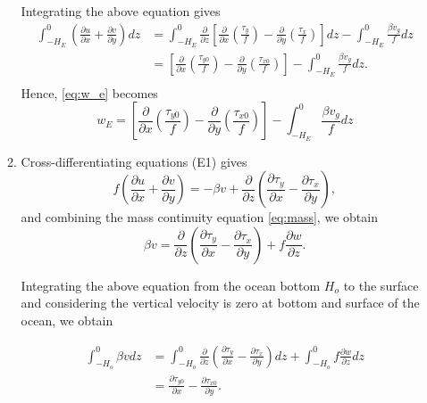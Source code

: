 \documentclass[a4paper]{article}
\begin{document}
\begin{enumerate}[label=\textbf{\arabic*.}]
\begin{enumerate}[label=\textbf{(\alph*)}]
			Integrating the above equation gives
			$$\begin{aligned}
			 \int_{-H_{E}}^{0} \left( \frac { \partial u } { \partial x } + \frac { \partial v} { \partial y }\right)dz 	&= \int_{ -H_E }^{0}\frac { \partial } {\partial z} \left[\frac{\partial }{\partial x} \left(\frac{\tau_y}{f}\right)- \frac{\partial }{\partial y}\left(\frac{\tau_x}{f}\right) \right] dz - \int_{- H_E }^{ 0} \frac { \beta v_{ g }  } { f } d z \\
			 & =\left[ \frac { \partial } { \partial x } \left( \frac { \tau  _ { y 0} } { f } \right) - \frac { \partial } { \partial y } \left( \frac { \tau _ { x0} } { f } \right)\right]- \int_{- H_E }^{ 0} \frac { \beta v_{ g }  } { f } d z.\\
			\end{aligned} $$
			Hence, \eqref{eq:w_e} becomes
			$$w_E=\left[ \frac { \partial } { \partial x } \left( \frac { \tau  _ { y 0} } { f } \right) - \frac { \partial } { \partial y } \left( \frac { \tau _ { x0} } { f } \right)\right]-\int_{- H_E }^{ 0} \frac { \beta v_{ g }  } { f } d z $$
			
			\item Cross-differentiating equations (E1) gives
			$$f\left(\frac { \partial u}{\partial x } + \frac { \partial v}{ \partial y }  \right) =  - \beta v+\frac { \partial } {\partial z} \left( \frac{\partial \tau_y}{\partial x} - \frac{\partial \tau_x}{\partial y} \right), $$
			and combining the mass continuity equation \eqref{eq:mass}, we obtain
			$$\beta v = \frac { \partial } {\partial z} \left( \frac{\partial \tau_y}{\partial x} - \frac{\partial \tau_x}{\partial y} \right) +f\frac{\partial w}{\partial z}.$$
			
			Integrating the above equation from the ocean bottom $H_o$ to the surface and considering the vertical velocity is zero at bottom and surface of the ocean, we obtain
			
			$$ \begin{aligned}
			\int_{-H_o}^0 \beta v d z & = \int_{-H_o}^0 \frac { \partial } {\partial z} \left( \frac{\partial \tau_y}{\partial x} - \frac{\partial \tau_x}{\partial y} \right) dz + \int_{-H_o}^0 f\frac{\partial w}{\partial z}dz\\
			&= \frac { \partial \tau_{y0} } { \partial x } - \frac { \partial \tau_{ x 0} } { \partial y }.
			\end{aligned} $$

		\end{enumerate}	
	
\end{enumerate}
\end{document}
